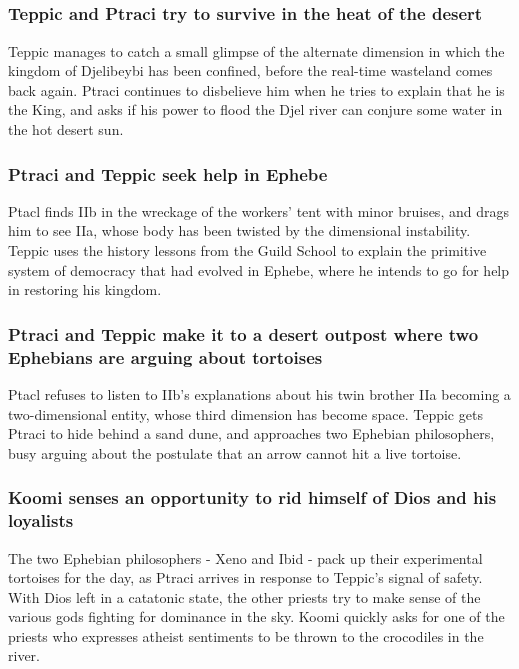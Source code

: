 \subsection{}
\subsubsection{\Gls{Teppic} and \Gls{Ptraci} try to survive in the heat of the desert}
\Gls{Teppic} manages to catch a small glimpse of the alternate dimension in which the kingdom
of Djelibeybi has been confined, before the real-time wasteland comes back again. \Gls{Ptraci}
continues to disbelieve him when he tries to explain that he is the King, and asks if his power to
flood the Djel river can conjure some water in the hot desert sun.

\subsubsection{\Gls{Ptraci} and \Gls{Teppic} seek help in Ephebe}
\Gls{Ptacl} finds \Gls{IIb} in the wreckage of the workers' tent with minor bruises, and drags him
to see \Gls{IIa}, whose body has been twisted by the dimensional instability. \Gls{Teppic} uses the
history lessons from the Guild School to explain the primitive system of democracy that had evolved
in Ephebe, where he intends to go for help in restoring his kingdom.

\subsubsection{\Gls{Ptraci} and \Gls{Teppic} make it to a desert outpost where two Ephebians are
    arguing about tortoises}
\Gls{Ptacl} refuses to listen to \Gls{IIb}'s explanations about his twin brother \Gls{IIa} becoming
a two-dimensional entity, whose third dimension has become space. \Gls{Teppic} gets \Gls{Ptraci}
to hide behind a sand dune, and approaches two Ephebian philosophers, busy arguing about the
postulate that an arrow cannot hit a live tortoise.

\subsubsection{\Gls{Koomi} senses an opportunity to rid himself of \Gls{Dios} and his loyalists}
The two Ephebian philosophers - \Gls{Xeno} and \Gls{Ibid} - pack up their experimental tortoises
for the day, as \Gls{Ptraci} arrives in response to \Gls{Teppic}'s signal of safety. With
\Gls{Dios} left in a catatonic state, the other priests try to make sense of the various gods
fighting for dominance in the sky. \Gls{Koomi} quickly asks for one of the priests who expresses
atheist sentiments to be thrown to the crocodiles in the river.

